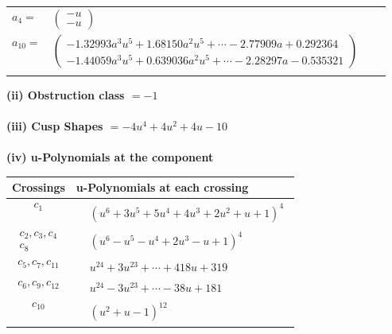 \documentclass[1p]{elsarticle_modified}
\theoremstyle{definition}
\begin{document}
\begin{tabular}{m{7pt} m{180pt} m{7pt} m{180pt} }
\flushright $a_{4}=$&$\begin{pmatrix}- u\\- u\end{pmatrix}$ \\
\flushright $a_{10}=$&$\begin{pmatrix}-1.32993 a^{3} u^{5}+1.68150 a^{2} u^{5}+\cdots-2.77909 a+0.292364\\-1.44059 a^{3} u^{5}+0.639036 a^{2} u^{5}+\cdots-2.28297 a-0.535321\end{pmatrix}$\\&\end{tabular}
\flushleft \textbf{(ii) Obstruction class $= -1$}\\~\\
\flushleft \textbf{(iii) Cusp Shapes $= -4 u^4+4 u^2+4 u-10$}\\~\\
\newpage\renewcommand{\arraystretch}{1}
\flushleft \textbf{(iv) u-Polynomials at the component}\newline \\
\begin{tabular}{m{50pt}|m{274pt}}
Crossings & \hspace{64pt}u-Polynomials at each crossing \\
\hline $$\begin{aligned}c_{1}\end{aligned}$$&$\begin{aligned}
&(u^6+3 u^5+5 u^4+4 u^3+2 u^2+u+1)^4
\end{aligned}$\\
\hline $$\begin{aligned}c_{2},c_{3},c_{4}\\c_{8}\end{aligned}$$&$\begin{aligned}
&(u^6- u^5- u^4+2 u^3- u+1)^4
\end{aligned}$\\
\hline $$\begin{aligned}c_{5},c_{7},c_{11}\end{aligned}$$&$\begin{aligned}
&u^{24}+3 u^{23}+\cdots+418 u+319
\end{aligned}$\\
\hline $$\begin{aligned}c_{6},c_{9},c_{12}\end{aligned}$$&$\begin{aligned}
&u^{24}-3 u^{23}+\cdots-38 u+181
\end{aligned}$\\
\hline $$\begin{aligned}c_{10}\end{aligned}$$&$\begin{aligned}
&(u^2+u-1)^{12}
\end{aligned}$\\
\hline
\end{tabular}\\~\\
\end{document}
